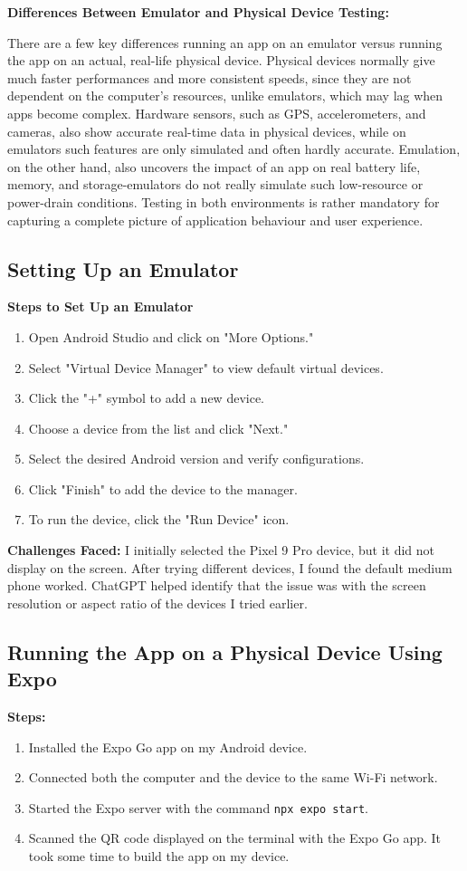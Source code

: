 \documentclass[a4paper,12pt]{article}
\begin{document}
\textbf{ Differences Between Emulator and Physical Device Testing:}

There are a few key differences running an app on an emulator versus running the app on an actual, real-life physical device. Physical devices normally give much faster performances and more consistent speeds, since they are not dependent on the computer's resources, unlike emulators, which may lag when apps become complex. Hardware sensors, such as GPS, accelerometers, and cameras, also show accurate real-time data in physical devices, while on emulators such features are only simulated and often hardly accurate. Emulation, on the other hand, also uncovers the impact of an app on real battery life, memory, and storage-emulators do not really simulate such low-resource or power-drain conditions. Testing in both environments is rather mandatory for capturing a complete picture of application behaviour and user experience.

\subsection{Setting Up an Emulator}
\textbf{Steps to Set Up an Emulator}
\begin{enumerate}
    \item Open Android Studio and click on "More Options."
    \item Select "Virtual Device Manager" to view default virtual devices.
    \item Click the "+" symbol to add a new device.
    \item Choose a device from the list and click "Next."
    \item Select the desired Android version and verify configurations.
    \item Click "Finish" to add the device to the manager.
    \item To run the device, click the "Run Device" icon.
\end{enumerate}

\textbf{Challenges Faced: }
I initially selected the Pixel 9 Pro device, but it did not display on the screen. After trying different devices, I found the default medium phone worked. ChatGPT helped identify that the issue was with the screen resolution or aspect ratio of the devices I tried earlier.

\subsection{Running the App on a Physical Device Using Expo}
\textbf{Steps:}
\begin{enumerate}
    \item Installed the Expo Go app on my Android device.
    \item Connected both the computer and the device to the same Wi-Fi network.
    \item Started the Expo server with the command \texttt{npx expo start}.
    \item Scanned the QR code displayed on the terminal with the Expo Go app. It took some time to build the app on my device.
\end{enumerate}
\end{document}
